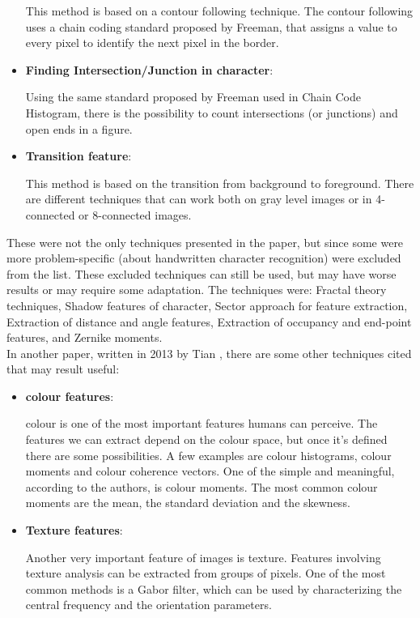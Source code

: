 \documentclass[conference]{IEEEtran}
\begin{document}
\begin{itemize}
						This method is based on a contour following technique. 
						The contour following uses a chain coding standard proposed by Freeman, that assigns a value to every pixel to identify the next pixel in the border.

					\item \textbf{Finding Intersection/Junction in character}:
					
						Using the same standard proposed by Freeman used in Chain Code Histogram, there is the possibility to count intersections (or junctions) and open ends in a figure.					
						
					\item \textbf{Transition feature}:
					
						This method is based on the transition from background to foreground. 
						There are different techniques that can work both on gray level images or in 4-connected or 8-connected images.
					
				\end{itemize}
			
			
			\noindent These were not the only techniques presented in the paper, but since some were more problem-specific (about handwritten character recognition)
			were excluded from the list. These excluded techniques can still be used, but may have worse results or may require some adaptation. 
			The techniques were: Fractal theory techniques, Shadow features of character, Sector approach for feature extraction, 
			Extraction of distance and angle features, Extraction of occupancy and end-point features, and Zernike moments.\\
			In another paper, written in 2013 by Tian \cite{ping2013review}, there are some other techniques cited that may result useful:
			
			\begin{itemize}
			
				\item \textbf{colour features}:
					
					colour is one of the most important features humans can perceive. 
					The features we can extract depend on the colour space, but once it's defined there are some possibilities. 
					A few examples are colour histograms, colour moments and colour coherence vectors. 
					One of the simple and meaningful, according to the authors, is colour moments. 
					The most common colour moments are the mean, the standard deviation and the skewness. 
					
				\item \textbf{Texture features}:
				
					Another very important feature of images is texture. 
					Features involving texture analysis can be extracted from groups of pixels. 
					One of the most common methods is a Gabor filter, which can be used by characterizing the central frequency and the orientation parameters.
			
			\end{itemize}
			
\end{document}
